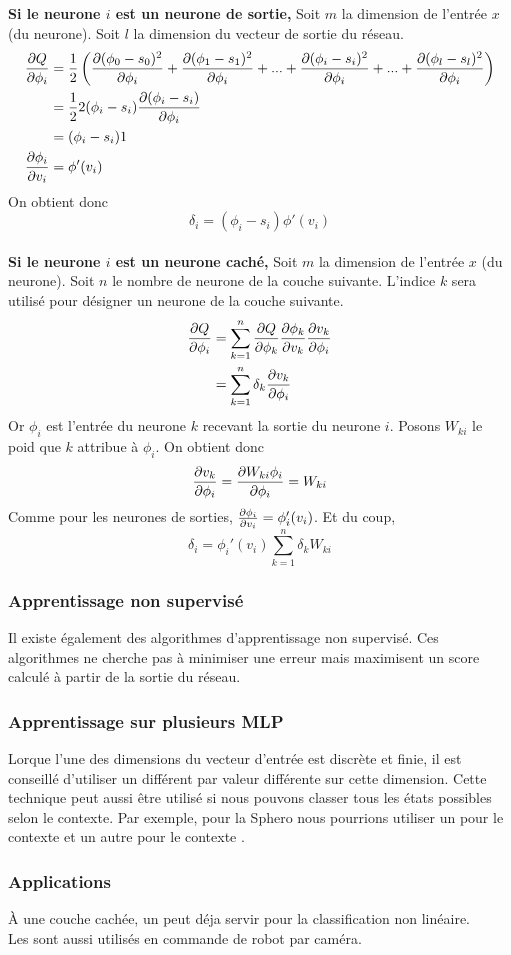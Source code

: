 \textbf{Si le neurone $i$ est un neurone de sortie,}
Soit $m$ la dimension de l'entrée $x$ (du neurone). Soit $l$ la dimension du vecteur de sortie du réseau.
\begin{equation}
 \begin{split}
  \frac{\partial Q}{\partial \phi_i} & = \frac{1}{2} \left( \frac{\partial (\phi_0 - s_0)^2}{\partial \phi_i} + \frac{\partial (\phi_1 - s_1)^2}{\partial \phi_i} + ... + \frac{\partial (\phi_i - s_i)^2}{\partial \phi_i} + ... + \frac{\partial (\phi_l - s_l)^2}{\partial \phi_i} \right)\\
  ~ & = \frac{1}{2}2(\phi_i - s_i)\frac{\partial (\phi_i - s_i)}{\partial \phi_i}\\
  ~ & = (\phi_i - s_i) 1\\
  \frac{\partial \phi_i}{\partial v_i} & = \phi'(v_i)
 \end{split}
\end{equation}\label{eq:a}
On obtient donc \[\delta_i = (\phi_i - s_i)\phi'(v_i)\]\\

\textbf{Si le neurone $i$ est un neurone caché,}
Soit $m$ la dimension de l'entrée $x$ (du neurone). Soit $n$ le nombre de neurone de la couche suivante.
L'indice $k$ sera utilisé pour désigner un neurone de la couche suivante.
\begin{equation}
 \begin{split}
  \frac{\partial Q}{\partial \phi_i} & = \sum_{k=1}^{n} \frac{\partial Q}{\partial \phi_k} \frac{\partial \phi_k}{\partial v_k} \frac{\partial v_k}{\partial \phi_i}\\
  ~ & = \sum_{k=1}^{n} \delta_k \frac{\partial v_k}{\partial \phi_i}
 \end{split}
\end{equation}
Or $\phi_i$ est l'entrée du neurone $k$ recevant la sortie du neurone $i$. Posons $W_{ki}$ le poid que $k$ attribue à $\phi_i$.
On obtient donc \[\frac{\partial v_k}{\partial \phi_i} = \frac{\partial W_{ki}\phi_i}{\partial \phi_i} = W_{ki}\]
Comme pour les neurones de sorties, $\frac{\partial \phi_i}{\partial v_i} = \phi_i'(v_i)$.
Et du coup, \[\delta_i = \phi_i'(v_i) \sum_{k=1}^{n} \delta_k W_{ki}\]
\subsubsection{Apprentissage non supervisé}
Il existe également des algorithmes d'apprentissage non supervisé.
Ces algorithmes ne cherche pas à minimiser une erreur mais maximisent un score calculé à partir de la sortie du réseau.
\subsubsection{Apprentissage sur plusieurs MLP}
Lorque l'une des dimensions du vecteur d'entrée est discrète et finie, il est conseillé d'utiliser un \mlp différent par valeur différente sur cette dimension.\cite{Gauthier}
Cette technique peut aussi être utilisé si nous pouvons classer tous les états possibles selon le contexte.
Par exemple, pour la Sphero nous pourrions utiliser un \mlp pour le contexte  et un autre \mlp pour le contexte .
\subsubsection{Applications}
À une couche cachée, un \mlp peut déja servir pour la classification non linéaire.\cite{statistica}\\
Les \mlp sont aussi utilisés en commande de robot par caméra.\cite{Pomerleau}